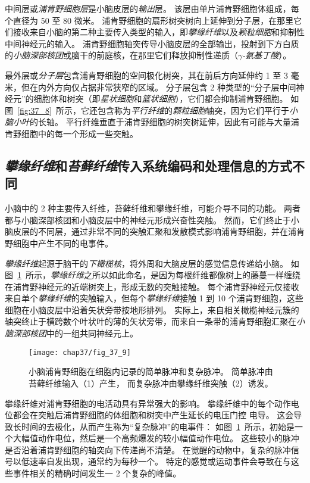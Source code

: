 中间层或\textit{浦肯野细胞层}是小脑皮层的\textit{输出}层。
该层由单片浦肯野细胞体组成，每个直径为 50 至 80 微米。
浦肯野细胞的扇形树突树向上延伸到分子层，在那里它们接收来自小脑的第二种主要传入类型的输入，即\textit{攀缘纤维}以及\textit{颗粒细胞}和抑制性中间神经元的输入。
浦肯野细胞轴突传导小脑皮层的全部输出，投射到下方白质的\textit{小脑深部核团}或脑干的前庭核，在那里它们释放抑制性递质（\textit{$\gamma$-氨基丁酸}）。


最外层或\textit{分子层}包含浦肯野细胞的空间极化树突，其在前后方向延伸约 1 至 3 毫米，但在内外方向仅占据非常狭窄的区域。
分子层包含 2 种类型的“分子层中间神经元”的细胞体和树突（即\textit{星状细胞}和\textit{篮状细胞}），它们都会抑制浦肯野细胞。
如图~\ref{fig:37_8}~所示，它还包含称为\textit{平行纤维}的\textit{颗粒细胞}轴突，因为它们平行于\textit{小脑小叶}的长轴。
平行纤维垂直于浦肯野细胞的树突树延伸，因此有可能与大量浦肯野细胞中的每一个形成一些突触。


\subsection{\textit{攀缘纤维}和\textit{苔藓纤维}传入系统编码和处理信息的方式不同}

小脑中的 2 种主要传入纤维，苔藓纤维和攀缘纤维，可能介导不同的功能。
两者都与小脑深部核团和小脑皮层中的神经元形成兴奋性突触。
然而，它们终止于小脑皮层的不同层，通过非常不同的突触汇聚和发散模式影响浦肯野细胞，并在浦肯野细胞中产生不同的电事件。


\textit{攀缘纤维}起源于脑干的\textit{下橄榄核}，将外周和大脑皮层的感觉信息传递给小脑。
如图~\ref{fig:37_9}~所示，\textit{攀缘纤维}之所以如此命名，是因为每根纤维都像树上的藤蔓一样缠绕在浦肯野神经元的近端树突上，形成无数的突触接触。
每个浦肯野神经元仅接收来自单个\textit{攀缘纤维}的突触输入，但每个\textit{攀缘纤维}接触 1 到 10 个浦肯野细胞，这些细胞在小脑皮层中沿着矢状旁带按地形排列。
实际上，来自相关橄榄神经元簇的轴突终止于横跨数个叶状叶的薄的矢状旁带，而来自一条带的浦肯野细胞汇聚在\textit{小脑深部核团}中的一组共同神经元上。


\begin{figure}[htbp]
	\centering
	\texttt{[image: chap37/fig\_37\_9]}
	\caption{小脑浦肯野细胞在细胞内记录的简单脉冲和复杂脉冲。
		简单脉冲由苔藓纤维输入（1）产生，
		而复杂脉冲由攀缘纤维突触（2）诱发\cite{martinez1971electrogenesis}。}
	\label{fig:37_9}
\end{figure}


攀缘纤维对浦肯野细胞的电活动具有异常强大的影响。
攀缘纤维中的每个动作电位都会在突触后浦肯野细胞的体细胞和树突中产生延长的电压门控  电导。
这会导致长时间的去极化，从而产生称为“复杂脉冲”的电事件：
如图~\ref{fig:37_9}~所示，初始是一个大幅值动作电位，然后是一个高频爆发的较小幅值动作电位。
这些较小的脉冲是否沿着浦肯野细胞的轴突向下传递尚不清楚。
在觉醒的动物中，复杂的脉冲信号以低速率自发出现，通常约为每秒一个。
特定的感觉或运动事件会导致在与这些事件相关的精确时间发生一 2 个复杂的峰值。


